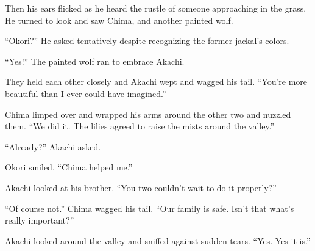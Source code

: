Then his ears flicked as he heard the rustle of someone approaching in the grass. He turned to look and saw Chima, and another painted wolf.

``Okori?'' He asked tentatively despite recognizing the former jackal's colors.

``Yes!'' The painted wolf ran to embrace Akachi.

They held each other closely and Akachi wept and wagged his tail. ``You're more beautiful than I ever could have imagined.''

Chima limped over and wrapped his arms around the other two and nuzzled them. ``We did it. The lilies agreed to raise the mists around the valley.''

``Already?'' Akachi asked.

Okori smiled. ``Chima helped me.''

Akachi looked at his brother. ``You two couldn't wait to do it properly?''

``Of course not.'' Chima wagged his tail. ``Our family is safe. Isn't that what's really important?''

Akachi looked around the valley and sniffed against sudden tears. ``Yes. Yes it is.''

